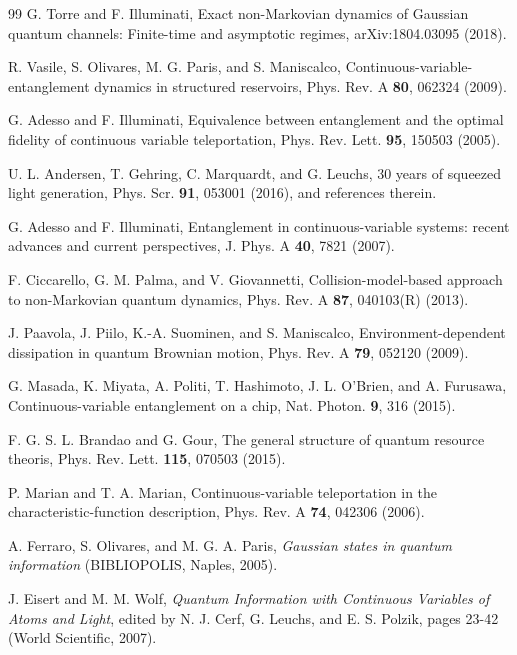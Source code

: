 \documentclass[prl,twocolumn,aps,floatfix,showpacs,tightenlines,superscriptaddress,amsmath,amssymb,amsfonts,10pt]{revtex4-1}
\begin{document}
\begin{thebibliography}{99}
G. Torre and F. Illuminati, Exact non-Markovian dynamics of Gaussian quantum channels: Finite-time and asymptotic regimes, arXiv:1804.03095 (2018).

R. Vasile, S. Olivares, M. G. Paris, and S. Maniscalco, Continuous-variable-entanglement dynamics in structured reservoirs, Phys. Rev. A {\bf 80}, 062324 (2009).

G. Adesso and F. Illuminati, Equivalence between entanglement and the optimal fidelity of continuous variable teleportation, Phys. Rev. Lett. {\bf 95}, 150503 (2005).

U. L. Andersen, T. Gehring, C. Marquardt, and G. Leuchs, 30 years of squeezed light generation, Phys. Scr. {\bf 91}, 053001 (2016), and references therein.

G. Adesso and F. Illuminati, Entanglement in continuous-variable systems: recent advances and current perspectives, J. Phys. A {\bf 40}, 7821 (2007).

F. Ciccarello, G. M. Palma, and V. Giovannetti, Collision-model-based approach to non-Markovian quantum dynamics, Phys. Rev. A {\bf 87}, 040103(R) (2013).

J. Paavola, J. Piilo, K.-A. Suominen, and S. Maniscalco, Environment-dependent dissipation in quantum Brownian motion, Phys. Rev. A {\bf 79}, 052120 (2009).

G. Masada, K. Miyata, A. Politi, T. Hashimoto, J. L. O'Brien, and A. Furusawa, Continuous-variable entanglement on a chip, Nat. Photon. {\bf 9}, 316 (2015).

F. G. S. L. Brandao and G. Gour, The general structure of quantum resource theoris, Phys. Rev. Lett. {\bf 115}, 070503 (2015).

P. Marian and T. A. Marian, Continuous-variable teleportation in the characteristic-function description, Phys. Rev. A {\bf 74}, 042306 (2006).

A. Ferraro, S. Olivares, and M. G. A. Paris, \textit{Gaussian states in quantum information} (BIBLIOPOLIS, Naples, 2005).

J. Eisert and M. M. Wolf, \textit{Quantum Information with Continuous Variables of Atoms and Light}, edited by N. J. Cerf, G. Leuchs, and E. S. Polzik, pages 23-42 (World Scientific, 2007).

\end{thebibliography}
\end{document}
